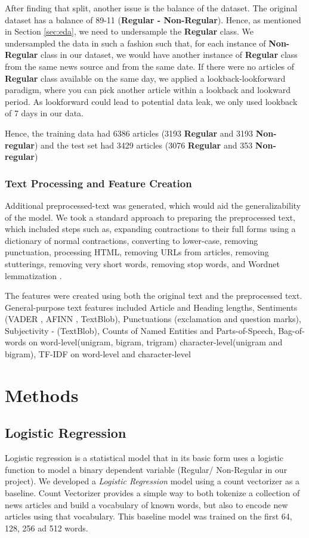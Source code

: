 \documentclass[11pt]{article}
\begin{document}
After finding that split, another issue is the balance of the dataset. The original dataset has a balance of 89-11 (\textbf{Regular - Non-Regular}). Hence, as mentioned in Section \ref{sec:eda}, we need to undersample the \textbf{Regular} class. We undersampled the data in such a fashion such that, for each instance of \textbf{Non-Regular} class in our dataset, we would have another instance of \textbf{Regular} class from the same news source and from the same date. If there were no articles of \textbf{Regular} class available on the same day, we applied a lookback-lookforward paradigm, where you can pick another article within a lookback and lookward period. As lookforward could lead to potential data leak, we only used lookback of 7 days in our data.

Hence, the training data had 6386 articles (3193 \textbf{Regular} and 3193 \textbf{Non-regular}) and the test set had 3429 articles (3076 \textbf{Regular} and 353 \textbf{ Non-regular})


\subsubsection{Text Processing and Feature Creation}
Additional preprocessed-text was generated, which would aid the generalizability of the model. We took a standard approach to preparing the preprocessed text, which included steps such as, expanding contractions to their full forms using a dictionary of normal contractions, converting to lower-case, removing punctuation, processing HTML, removing URLs from articles, removing stutterings, removing very short words, removing stop words, and Wordnet lemmatization \cite{miller1995wordnet}.

The features were created using both the original text and the preprocessed text. General-purpose text features included Article and Heading lengths, Sentiments (VADER \cite{hutto2014vader}, AFINN \cite{nielsen2011new}, TextBlob), Punctuations (exclamation and question marks), Subjectivity - (TextBlob), Counts of Named Entities and Parts-of-Speech,
Bag-of-words on word-level(unigram, bigram, trigram) character-level(unigram and bigram), TF-IDF on word-level and character-level


\section{Methods}
\label{sec:methods}
\subsection{Logistic Regression}
Logistic regression is a statistical model that in its basic form uses a logistic function to model a binary dependent variable (Regular/ Non-Regular in our project). We developed a \textit{Logistic Regression} model using a count vectorizer as a baseline. Count Vectorizer provides a simple way to both tokenize a collection of news articles and build a vocabulary of known words, but also to encode new articles using that vocabulary. This baseline model was trained on the first 64, 128, 256 ad 512 words.
\end{document}
